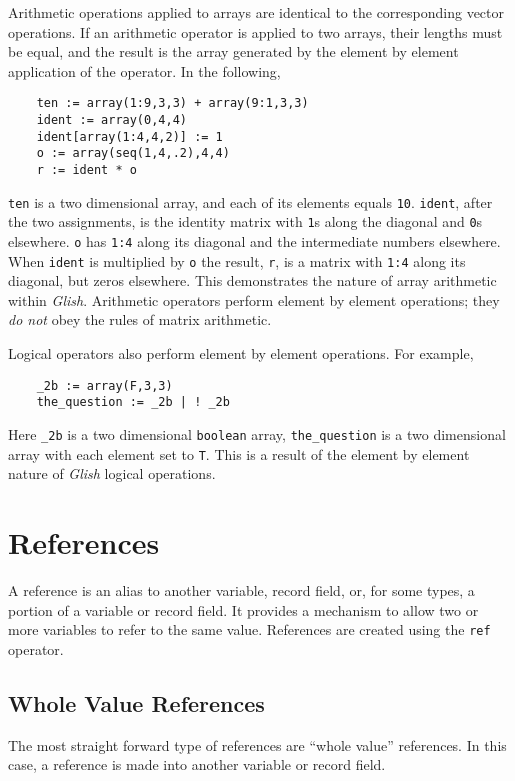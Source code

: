 Arithmetic operations applied to arrays are identical to the corresponding
vector operations. If an arithmetic operator is applied to two arrays, their
lengths must be equal, and the result is the array generated by the element
by element application of the operator. In the following,
\begin{verbatim}
    ten := array(1:9,3,3) + array(9:1,3,3)
    ident := array(0,4,4)
    ident[array(1:4,4,2)] := 1
    o := array(seq(1,4,.2),4,4)
    r := ident * o
\end{verbatim}
{\tt ten} is a two dimensional array, and each of its elements equals
{\tt 10}. {\tt ident}, after the two assignments, is the identity matrix
with {\tt 1}s along the diagonal and {\tt 0}s elsewhere. {\tt o} has 
{\tt 1:4} along its diagonal and the intermediate numbers elsewhere.
When {\tt ident} is multiplied by {\tt o} the result, {\tt r}, is a
matrix with {\tt 1:4} along its diagonal, but zeros elsewhere. This 
demonstrates the nature of array arithmetic within {\em Glish}. Arithmetic operators
perform element by element operations; they {\em do not} obey the rules of 
matrix arithmetic.

Logical operators also perform element by element operations. For example,
\begin{verbatim}
    _2b := array(F,3,3)
    the_question := _2b | ! _2b
\end{verbatim}
Here {\tt \_2b} is a two dimensional {\tt boolean} array, {\tt the\_question} 
is a two dimensional array with each element set to {\tt T}. This is a result
of the element by element nature of {\em Glish} logical operations.


\section{References}
\label{references}

A reference is an alias to another variable, record field, or, for some types,
a portion of a variable or record field. It provides a mechanism to allow two
or more variables to refer to the same value. References are created using
the {\tt ref} operator.

\subsection{Whole Value References}
\label{whole-value-references}
The most straight forward type of references are ``whole value'' references. In this
case, a reference is made into another variable or record field.

